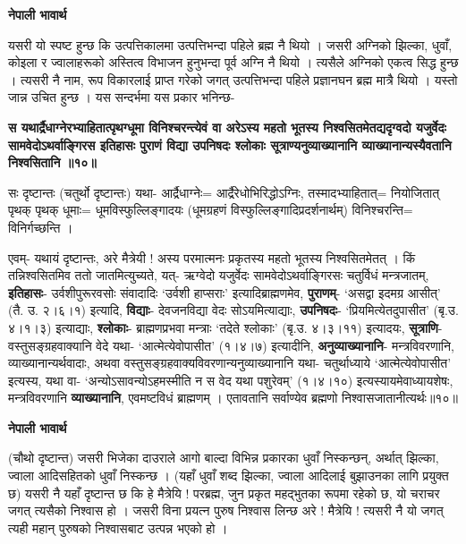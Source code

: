 \documentclass[11pt, a5paper]{article}
\begin{document}
\textbf{नेपाली भावार्थ}

यसरी यो स्पष्ट हुन्छ कि उत्पत्तिकालमा उत्पत्तिभन्दा पहिले ब्रह्म नै थियो । जसरी अग्निको झिल्का, धुवाँ, कोइला र ज्वालाहरूको अस्तित्व विभाजन हुनुभन्दा पूर्व अग्नि नै थियो । त्यसैले अग्निको एकत्व सिद्ध हुन्छ । त्यसरी नै नाम, रूप विकारलाई प्राप्त गरेको जगत् उत्पत्तिभन्दा पहिले प्रज्ञानघन ब्रह्म मात्रै थियो । यस्तो जान्न उचित हुन्छ । यस सन्दर्भमा यस प्रकार भनिन्छ-

\textbf{स यथार्द्रैधाग्नेरभ्याहितात्पृथग्धूमा विनिश्चरन्त्येवं वा अरेऽस्य महतो भूतस्य निश्वसितमेतद्यदृग्वदो यजुर्वेदः सामवेदोऽथर्वाङ्गिरस इतिहासः पुराणं विद्या उपनिषदः श्लोकाः सूत्राण्यनुव्याख्यानानि व्याख्यानान्यस्यैवतानि निश्वसितानि ॥१०॥}

सः दृष्टान्तः (चतुर्थो दृष्टान्तः) यथा- आर्द्रैधाग्नेः= आर्द्रैरेधोभिरिद्धोऽग्निः,  तस्मादभ्याहितात्= नियोजितात् पृथक् पृथक् धूमाः= धूमविस्फुल्लिङ्गादयः (धूमग्रहणं विस्फुल्लिङ्गादिप्रदर्शनार्थम्) विनिश्चरन्ति= विनिर्गच्छन्ति ।

एवम्- यथायं दृष्टान्तः, अरे मैत्रेयी ! अस्य परमात्मनः प्रकृतस्य महतो भूतस्य निश्वसितमेतत् । किं तन्निश्वसितमिव ततो जातमित्युच्यते, यत्- ऋग्वेदो यजुर्वेदः सामवेदोऽथर्वाङ्गिरसः चतुर्विधं मन्त्रजातम्, \textbf{इतिहासः}- उर्वशीपुरूरवसोः संवादादिः ‘उर्वशी हाप्सराः’ इत्यादिब्राह्मणमेव, \textbf{पुराणम्}- ‘असद्वा इदमग्र आसीत्’ (तै. उ. २।६।१) इत्यादि, \textbf{विद्याः}- देवजनविद्या वेदः सोऽयमित्याद्याः, \textbf{उपनिषदः}- ‘प्रियमित्येतदुपासीत’ (बृ.उ. ४।१।३) इत्याद्याः, \textbf{श्लोकाः}- ब्राह्मणप्रभवा मन्त्राः ‘तदेते श्लोकाः’ (बृ.उ. ४।३।११) इत्यादयः, \textbf{सूत्राणि}- वस्तुसङ्‍ग्रहवाक्यानि वेदे यथा- ‘आत्मेत्येवोपासीत’ (१।४।७) इत्यादीनि, \textbf{अनुव्याख्यानानि}- मन्त्रविवरणानि, व्याख्यानान्यर्थवादाः, अथवा वस्तुसङ्‍ग्रहवाक्यविवरणान्यनुव्याख्यानानि यथा- चतुर्थाध्याये ‘आत्मेत्येवोपासीत’ इत्यस्य, यथा वा- ‘अन्योऽसावन्योऽहमस्मीति न स वेद यथा पशुरेवम्’ (१।४।१०) इत्यस्यायमेवाध्यायशेषः, मन्त्रविवरणानि \textbf{व्याख्यानानि}, एवमष्टविधं ब्राह्मणम् । एतावतानि सर्वाण्येव ब्रह्मणो निश्वासजातानीत्यर्थः॥१०॥

\textbf{नेपाली भावार्थ}

(चौथो दृष्टान्त) जसरी भिजेका दाउराले आगो बाल्दा विभिन्न प्रकारका धुवाँ निस्कन्छन्, अर्थात् झिल्का, ज्वाला  आदिसहितको धुवाँ निस्कन्छ । (यहाँ धुवाँ शब्द झिल्का, ज्वाला आदिलाई बुझाउनका लागि प्रयुक्त छ) यसरी नै यहाँ दृष्टान्त छ कि हे मैत्रेयि ! परब्रह्म, जुन प्रकृत महद्भुतका रूपमा रहेको छ, यो चराचर जगत् त्यसैको निश्वास हो । जसरी विना प्रयत्न पुरुष निश्वास लिन्छ अरे ! मैत्रेयि ! त्यसरी नै यो जगत् त्यही महान् पुरुषको निश्वासबाट उत्पन्न भएको हो ।
\end{document}
